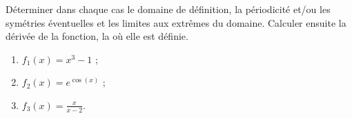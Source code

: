 \begin{exercice}\label{exomazhe-0015}

Déterminer dans chaque cas le domaine de définition, la périodicité et/ou les symétries éventuelles et les limites aux extrêmes du domaine. Calculer ensuite la dérivée de la fonction, la où elle est définie.       
    \begin{enumerate}
    \item $\displaystyle f_1(x)= x^3-1$ ;
    \item $\displaystyle f_2(x)= e^{\cos(x)}$ ;
    \item $\displaystyle f_3(x)= \frac{x}{x-2}$. 
    \end{enumerate}

\end{exercice}
